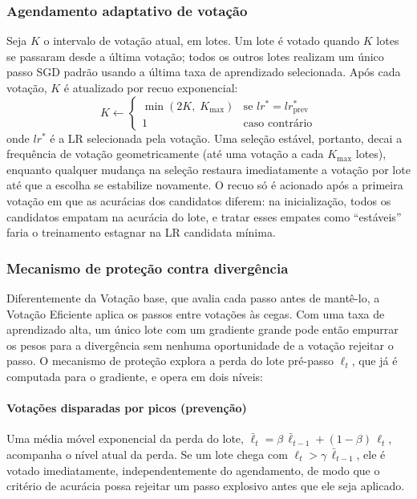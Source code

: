 \documentclass[conference]{IEEEtran}
\begin{document}
\subsubsection{Agendamento adaptativo de votação}
Seja $K$ o intervalo de votação atual, em lotes. Um lote é votado quando $K$ lotes se passaram desde a última votação; todos os outros lotes realizam um único passo SGD padrão usando a última taxa de aprendizado selecionada. Após cada votação, $K$ é atualizado por recuo exponencial:
\begin{equation}
K \leftarrow
\begin{cases}
\min(2K,\; K_{\max}) & \text{se } lr^{*} = lr^{*}_{\mathrm{prev}} \\
1 & \text{caso contrário}
\end{cases}
\label{eq:backoff}
\end{equation}
onde $lr^{*}$ é a LR selecionada pela votação. Uma seleção estável, portanto, decai a frequência de votação geometricamente (até uma votação a cada $K_{\max}$ lotes), enquanto qualquer mudança na seleção restaura imediatamente a votação por lote até que a escolha se estabilize novamente. O recuo só é acionado após a primeira votação em que as acurácias dos candidatos diferem: na inicialização, todos os candidatos empatam na acurácia do lote, e tratar esses empates como ``estáveis'' faria o treinamento estagnar na LR candidata mínima.

\subsubsection{Mecanismo de proteção contra divergência}
Diferentemente da Votação base, que avalia cada passo antes de mantê-lo, a Votação Eficiente aplica os passos entre votações às cegas. Com uma taxa de aprendizado alta, um único lote com um gradiente grande pode então empurrar os pesos para a divergência sem nenhuma oportunidade de a votação rejeitar o passo. O mecanismo de proteção explora a perda do lote pré-passo $\ell_t$, que já é computada para o gradiente, e opera em dois níveis:

\paragraph{Votações disparadas por picos (prevenção)} Uma média móvel exponencial da perda do lote, $\bar{\ell}_t = \beta\,\bar{\ell}_{t-1} + (1-\beta)\,\ell_t$, acompanha o nível atual da perda. Se um lote chega com $\ell_t > \gamma\,\bar{\ell}_{t-1}$, ele é votado imediatamente, independentemente do agendamento, de modo que o critério de acurácia possa rejeitar um passo explosivo antes que ele seja aplicado.
\end{document}
